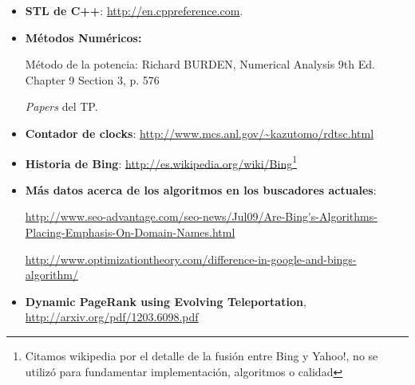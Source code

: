 \begin{itemize}
	\item \textbf{STL de C++}: \url{http://en.cppreference.com}.
	\item \textbf{Métodos Numéricos:}
		\par Método de la potencia: Richard BURDEN, Numerical Analysis 9th Ed. Chapter 9 Section 3, p. 576
		\par \textit{Papers} del TP.
	\item \textbf{Contador de clocks}: \url{http://www.mcs.anl.gov/\~kazutomo/rdtsc.html}
	\item \textbf{Historia de Bing}: \url{http://es.wikipedia.org/wiki/Bing}\footnote{Citamos wikipedia por el detalle de la fusión entre Bing y Yahoo!, no se utilizó para fundamentar implementación, algoritmos o calidad}
	\item \textbf{Más datos acerca de los algoritmos en los buscadores actuales}:
			\par \url{http://www.seo-advantage.com/seo-news/Jul09/Are-Bing's-Algorithms-Placing-Emphasis-On-Domain-Names.html}
			\par \url{http://www.optimizationtheory.com/difference-in-google-and-bings-algorithm/}
	\item \textbf{Dynamic PageRank using Evolving Teleportation}, \url{http://arxiv.org/pdf/1203.6098.pdf}
\end{itemize}




